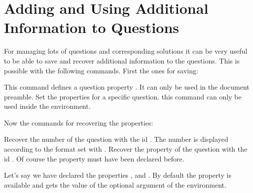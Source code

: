 \documentclass[DIV10,toc=index,toc=bib,numbers=noendperiod]{cnpkgdoc}
\begin{document}
\section{Adding and Using Additional Information to Questions}\label{sec:additional_info}
For managing lots of questions and corresponding solutions it can be very
useful to be able to save and recover additional information to the questions.
This is possible with the following commands.  First the ones for saving:
\begin{beschreibung}
  \newline
    This command defines a question property .  It can only be
    used in the document preamble.
  \newline
    Set the properties for a specific question. this command can only be used
    inside the  environment.
\end{beschreibung}
Now the commands for recovering the properties:
\begin{beschreibung}
  \newline
    Recover the number of the question with the \acs{id} .  The
    number is displayed according to the format set with
    .
  \newline
    Recover the property  of the question with the \acs{id}
    .  Of course the property must have been declared before.
\end{beschreibung}

Let's say we have declared the properties ,  and
.  By default the property  is available and gets the
value of the optional argument of the  environment.
\end{document}
